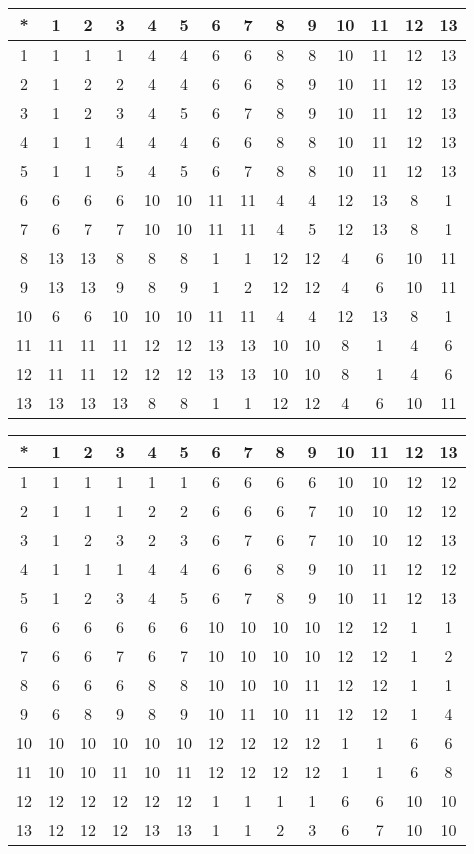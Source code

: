 \begin{tabular}[t]{c|ccccccccccccc}
*&1&2&3&4&5&6&7&8&9&10&11&12&13 \\ \hline
    1&1&1&1&4&4&6&6&8&8&10&11&12&13 \\
    2&1&2&2&4&4&6&6&8&9&10&11&12&13 \\
    3&1&2&3&4&5&6&7&8&9&10&11&12&13 \\
    4&1&1&4&4&4&6&6&8&8&10&11&12&13 \\
    5&1&1&5&4&5&6&7&8&8&10&11&12&13 \\
    6&6&6&6&10&10&11&11&4&4&12&13&8&1 \\
    7&6&7&7&10&10&11&11&4&5&12&13&8&1 \\
    8&13&13&8&8&8&1&1&12&12&4&6&10&11 \\
    9&13&13&9&8&9&1&2&12&12&4&6&10&11 \\
    10&6&6&10&10&10&11&11&4&4&12&13&8&1 \\
    11&11&11&11&12&12&13&13&10&10&8&1&4&6 \\
    12&11&11&12&12&12&13&13&10&10&8&1&4&6 \\
    13&13&13&13&8&8&1&1&12&12&4&6&10&11 
\end{tabular}


\begin{tabular}[t]{c|ccccccccccccc}
*&1&2&3&4&5&6&7&8&9&10&11&12&13 \\ \hline
    1&1&1&1&1&1&6&6&6&6&10&10&12&12 \\
    2&1&1&1&2&2&6&6&6&7&10&10&12&12 \\
    3&1&2&3&2&3&6&7&6&7&10&10&12&13 \\
    4&1&1&1&4&4&6&6&8&9&10&11&12&12 \\
    5&1&2&3&4&5&6&7&8&9&10&11&12&13 \\
    6&6&6&6&6&6&10&10&10&10&12&12&1&1 \\
    7&6&6&7&6&7&10&10&10&10&12&12&1&2 \\
    8&6&6&6&8&8&10&10&10&11&12&12&1&1 \\
    9&6&8&9&8&9&10&11&10&11&12&12&1&4 \\
    10&10&10&10&10&10&12&12&12&12&1&1&6&6 \\
    11&10&10&11&10&11&12&12&12&12&1&1&6&8 \\
    12&12&12&12&12&12&1&1&1&1&6&6&10&10 \\
    13&12&12&12&13&13&1&1&2&3&6&7&10&10 
\end{tabular}


